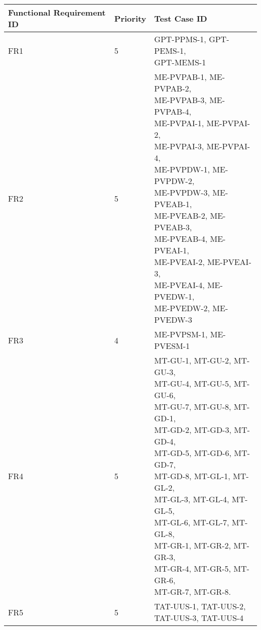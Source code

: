 \documentclass[12pt, titlepage]{article}
\begin{document}
\begin{table}[h]
\begin{tabular}{|p{3cm}|p{3cm}|p{7cm}|}
 \hline
 Functional Requirement ID & Priority & Test Case ID\\
 \hline
 FR1 & 5 & \makecell[l]{GPT-PPMS-1, GPT-PEMS-1,\\ GPT-MEMS-1}\\ 
 \hline
 FR2 & 5 & \makecell[l]{ME-PVPAB-1, ME-PVPAB-2,\\ ME-PVPAB-3, ME-PVPAB-4,\\ ME-PVPAI-1, ME-PVPAI-2,\\ ME-PVPAI-3, ME-PVPAI-4,\\ ME-PVPDW-1, ME-PVPDW-2,\\ ME-PVPDW-3, ME-PVEAB-1,\\ ME-PVEAB-2, ME-PVEAB-3,\\ ME-PVEAB-4, ME-PVEAI-1,\\ ME-PVEAI-2, ME-PVEAI-3,\\ ME-PVEAI-4, ME-PVEDW-1,\\ ME-PVEDW-2, ME-PVEDW-3}\\
 \hline
 FR3 & 4 & ME-PVPSM-1, ME-PVESM-1\\
 \hline
 FR4 & 5 & \makecell[l]{MT-GU-1, MT-GU-2, MT-GU-3,\\ MT-GU-4, MT-GU-5, MT-GU-6,\\ MT-GU-7, MT-GU-8, MT-GD-1,\\ MT-GD-2, MT-GD-3, MT-GD-4,\\ MT-GD-5, MT-GD-6, MT-GD-7,\\ MT-GD-8, MT-GL-1, MT-GL-2,\\ MT-GL-3, MT-GL-4, MT-GL-5,\\ MT-GL-6, MT-GL-7, MT-GL-8,\\ MT-GR-1, MT-GR-2, MT-GR-3,\\ MT-GR-4, MT-GR-5, MT-GR-6,\\ MT-GR-7, MT-GR-8.}\\
 \hline
FR5 & 5 & \makecell[l]{TAT-UUS-1, TAT-UUS-2,\\ TAT-UUS-3, TAT-UUS-4}\\
\hline
 \end{tabular}
\end{table}
\end{document}

